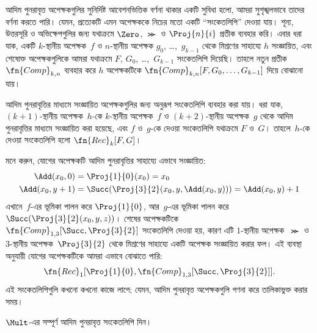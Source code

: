 \documentclass[../../../include/open-logic-section]{subfiles}
\begin{document}

আদিম পুনরাবৃত্ত অপেক্ষকগুলির সুনির্দিষ্ট আবেশনভিত্তিক বর্ণনা থাকার একটি
সুবিধা হলো, আমরা সুশৃঙ্খলভাবে তাদের বর্ণনা করতে পারি। যেমন, প্রত্যেকটি
এমন অপেক্ষককে নিচের মতো একটি “সংকেতলিপি” দেওয়া যায়। শূন্য, উত্তরসূরি
ও অভিক্ষেপগুলির জন্য যথাক্রমে $\Zero$, $\Succ$ ও $\Proj{n}{i}$ প্রতীক
ব্যবহার করি। এবার ধরা যাক, একটি $k$-স্থানীয় অপেক্ষক~$f$ ও
$n$-স্থানীয় অপেক্ষক $g_0$, \dots,~$g_{k-1}$ থেকে মিশ্রণের সাহায্যে
$h$ সংজ্ঞায়িত, এবং শেষোক্ত অপেক্ষকগুলিকে আমরা যথাক্রমে $F$, $G_0$,
\dots,~$G_{k-1}$ সংকেতলিপি দিয়েছি। তাহলে নতুন প্রতীক
$\fn{Comp}_{k,n}$ ব্যবহার করে $h$ অপেক্ষকটিকে
$\fn{Comp}_{k,n}[F,G_0,\dots,G_{k-1}]$ দিয়ে বোঝানো যায়।

আদিম পুনরাবৃত্তির মাধ্যমে সংজ্ঞায়িত অপেক্ষকগুলির জন্য অনুরূপ সংকেতলিপি
ব্যবহার করা যায়। ধরা যাক, $(k+1)$-স্থানীয় অপেক্ষক~$h$-কে
$k$-স্থানীয় অপেক্ষক~$f$ ও $(k+2)$-স্থানীয় অপেক্ষক~$g$ থেকে আদিম
পুনরাবৃত্তির মাধ্যমে সংজ্ঞায়িত করা হয়েছে, এবং $f$ ও~$g$-কে দেওয়া
সংকেতলিপি যথাক্রমে $F$ ও~$G$। তাহলে~$h$-কে দেওয়া সংকেতলিপি হলো
$\fn{Rec}_k[F,G]$।

মনে করুন, যোগের অপেক্ষকটি আদিম পুনরাবৃত্তির সাহায্যে এভাবে সংজ্ঞায়িত:
\begin{align*}
  \Add(x_0, 0) & = \Proj{1}{0}(x_0) = x_0\\
  \Add(x_0, y+1) & = \Succ(\Proj{3}{2}(x_0, y, \Add(x_0, y))) = \Add(x_0, y) +1
\end{align*}
এখানে~$f$-এর ভূমিকা পালন করে $\Proj{1}{0}$, আর~$g$-এর ভূমিকা পালন করে
$\Succ(\Proj{3}{2}(x_0, y, z))$। শেষের অপেক্ষকটিকে
$\fn{Comp}_{1,3}[\Succ,\Proj{3}{2}]$ সংকেতলিপি দেওয়া হয়, কারণ এটি
$1$-স্থানীয় অপেক্ষক~$\Succ$ ও $3$-স্থানীয় অপেক্ষক~$\Proj{3}{2}$ থেকে
মিশ্রণের সাহায্যে একটি অপেক্ষক সংজ্ঞায়িত করার ফল। এই ব্যবস্থা অনুযায়ী
যোগের অপেক্ষকটিকে আমরা এভাবে বোঝাতে পারি:
\[
\fn{Rec}_1[\Proj{1}{0},\fn{Comp}_{1,3}[\Succ,\Proj{3}{2}]].
\]
এই সংকেতলিপিগুলি কখনো কখনো কাজে লাগে; যেমন, আদিম পুনরাবৃত্ত অপেক্ষকগুলি
গণনা করে তালিকাভুক্ত করার সময়।

\begin{prob}
  $\Mult$-এর সম্পূর্ণ আদিম পুনরাবৃত্ত সংকেতলিপি দিন।
\end{prob}
\end{document}
